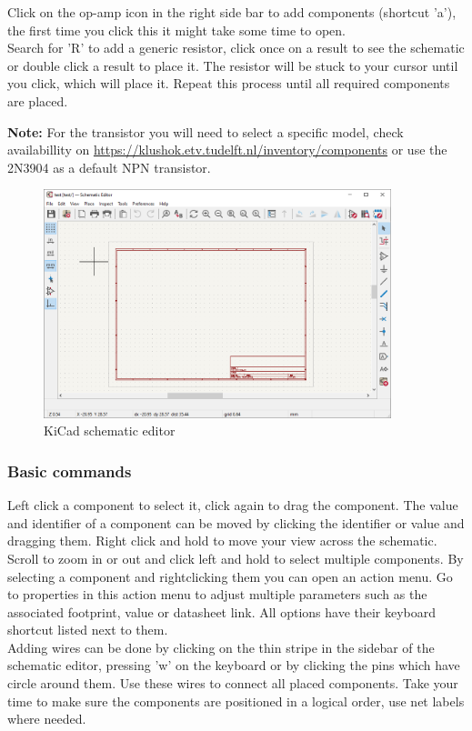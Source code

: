 \documentclass[12pt]{article}
\begin{document}
Click on the op-amp icon in the right side bar to add components (shortcut 'a'), the first time you click this it might take some time to open.\\
Search for 'R' to add a generic resistor, click once on a result to see the schematic or double click a result to place it. The resistor will be stuck to your cursor until you click, which will place it. 
Repeat this process until all required components are placed.\\\vspace{1ex}

\textbf{Note:} For the transistor you will need to select a specific model, check availabillity on \url{https://klushok.etv.tudelft.nl/inventory/components} or use the 2N3904 as a default NPN transistor.
\\\vspace{2ex}

\begin{figure}[H]
	\centering
	\includegraphics[width=0.9\textwidth]{../images/schematic_editor.png}
	\caption{KiCad schematic editor}
	\label{fig:schematic_editor}
\end{figure}



\subsubsection{Basic commands}
Left click a component to select it, click again to drag the component.
The value and identifier of a component can be moved by clicking the identifier or value and dragging them.
Right click and hold to move your view across the schematic. 
Scroll to zoom in or out and click left and hold to select multiple components.
By selecting a component and rightclicking them you can open an action menu. 
Go to properties in this action menu to adjust multiple parameters such as the associated footprint, value or datasheet link. All options have their keyboard shortcut listed next to them.\\
Adding wires can be done by clicking on the thin stripe in the sidebar of the schematic editor, pressing 'w' on the keyboard or by clicking the pins which have circle around them. Use these wires to connect all placed components. Take your time to make sure the components are positioned in a logical order, use net labels where needed.
\end{document}
